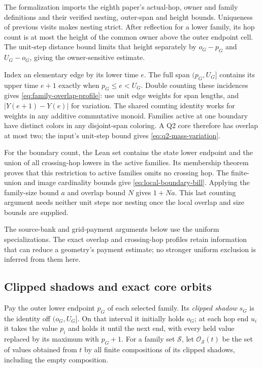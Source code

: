 \begin{outline}
The formalization imports the eighth paper's actual-hop, owner and
family definitions and their verified nesting, outer-span and height
bounds. Uniqueness of previous visits makes nesting strict. After
reflection for a lower family, its hop count is at most the height
of the common owner above the outer endpoint cell. The unit-step
distance bound limits that height separately by $o_G-p_G$ and
$U_G-o_G$, giving the owner-sensitive estimate.

Index an elementary edge by its lower time $e$. The full span
$(p_G,U_G]$ contains its upper time $e+1$ exactly when
$p_G\le e<U_G$. Double counting these incidences gives
\cref{eq:family-overlap-profile}: use unit edge weights for span
lengths, and $|Y(e+1)-Y(e)|$ for variation. The shared counting
identity works for weights in any additive commutative monoid.
Families active at one boundary have distinct colors in any
disjoint-span coloring. A Q2 core therefore has overlap at most two;
the input's unit-step bound gives \cref{eq:q2-mass-variation}.

For the boundary count, the Lean set contains the state lower
endpoint and the union of all crossing-hop lowers in the active
families. Its membership theorem proves that this restriction to
active families omits no crossing hop. The finite-union and image
cardinality bounds give \cref{eq:local-boundary-bill}. Applying the
family-size bound $a$ and overlap bound $N$ gives $1+Na$.
This last counting argument needs neither unit steps nor nesting
once the local overlap and size bounds are supplied.
\end{outline}

The source-bank and grid-payment arguments below use the uniform
specializations. The exact overlap and crossing-hop profiles retain
information that can reduce a geometry's payment estimate; no stronger
uniform exclusion is inferred from them here.

\subsection{Clipped shadows and exact core orbits}

\begin{definition}\label{def:clipped-shadow}
Pay the outer lower endpoint $p_G$ of each selected family. Its
\emph{clipped shadow} $s_G$ is the identity off $(o_G,U_G]$. On that
interval it initially holds $o_G$; at each hop end $u_i$ it takes the
value $p_i$ and holds it until the next end, with every held value
replaced by its maximum with $p_G+1$. For a family set $\mathcal S$,
let $\mathcal O_{\mathcal S}(t)$ be the set of values obtained from $t$
by all finite compositions of its clipped shadows, including the empty
composition.
\end{definition}

